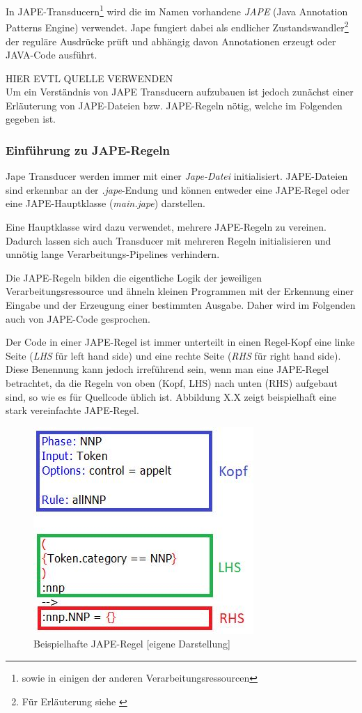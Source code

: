 \documentclass[12pt]{report}
\begin{document}
In JAPE-Transducern\footnote{sowie in einigen der anderen Verarbeitungsressourcen} wird die im Namen vorhandene \textit{JAPE} (Java Annotation Patterns Engine) verwendet. Jape fungiert dabei als endlicher Zustandswandler\footnote{Für Erläuterung siehe \cite{rs18}} der reguläre Ausdrücke prüft und abhängig davon 
Annotationen erzeugt oder JAVA-Code ausführt.
 
HIER EVTL QUELLE VERWENDEN\\

Um ein Verständnis von JAPE Transducern aufzubauen ist jedoch zunächst einer Erläuterung von JAPE-Dateien bzw. JAPE-Regeln nötig, welche im Folgenden gegeben ist.

\subsubsection{Einführung zu JAPE-Regeln}
Jape Transducer werden immer mit einer \textit{Jape-Datei} initialisiert. JAPE-Dateien sind erkennbar an der \textit{.jape}-Endung und können entweder eine JAPE-Regel oder eine JAPE-Hauptklasse (\textit{main.jape}) darstellen. 

Eine Hauptklasse wird dazu verwendet, mehrere JAPE-Regeln zu vereinen. Dadurch lassen sich auch Transducer mit mehreren Regeln initialisieren und unnötig lange Verarbeitungs-Pipelines verhindern. 

Die JAPE-Regeln bilden die eigentliche Logik der jeweiligen Verarbeitungsressource und ähneln kleinen Programmen mit der Erkennung einer Eingabe und der Erzeugung einer bestimmten Ausgabe. Daher wird im Folgenden auch von JAPE-Code gesprochen. 

Der Code in einer JAPE-Regel ist immer unterteilt in einen Regel-Kopf eine linke Seite (\textit{LHS} für left hand side) und eine rechte Seite (\textit{RHS} für right hand side). Diese Benennung kann jedoch irreführend sein, wenn man eine JAPE-Regel betrachtet, da die Regeln von oben (Kopf, LHS) nach unten (RHS) aufgebaut sind, so wie es für Quellcode üblich ist. Abbildung X.X zeigt beispielhaft eine stark vereinfachte JAPE-Regel.

\begin{figure}[H]
\begin{center}
\includegraphics[scale=1]{Bilder/Regel-Bsp.png}
\caption{Beispielhafte JAPE-Regel [eigene Darstellung]}
\end{center}
\end{figure}
\end{document}

